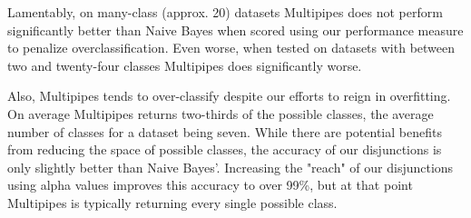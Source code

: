 Lamentably, on many-class (approx. 20) datasets Multipipes does not perform significantly better than Naive Bayes when scored using our performance measure to penalize overclassification. Even worse, when tested on datasets with between two and twenty-four classes Multipipes does significantly worse.


Also, Multipipes tends to over-classify despite our efforts to reign in overfitting. On average Multipipes returns two-thirds of the possible classes, the average number of classes for a dataset being seven. While there are potential benefits from reducing the space of possible classes, the accuracy of our disjunctions is only slightly better than Naive Bayes'. Increasing the "reach" of our disjunctions using alpha values improves this accuracy to over 99\%, but at that point Multipipes is typically returning every single possible class.

